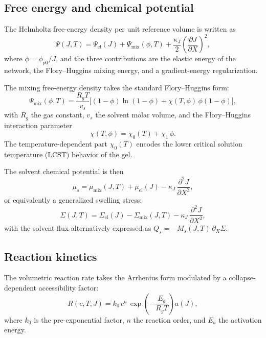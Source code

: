 \documentclass[aps,pre,reprint,superscriptaddress,longbibliography,floatfix]{revtex4-2}
\newcommand{\pp}{\phi_{p0}}
\begin{document}
\subsection{Free energy and chemical potential}

The Helmholtz free-energy density per unit reference volume is written as
\begin{equation}
  \Psi(J,T) = \Psi_\mathrm{el}(J) + \Psi_\mathrm{mix}(\phi,T)
  + \frac{\kappa_J}{2}\left(\frac{\partial J}{\partial X}\right)^2,
  \label{eq:Psi}
\end{equation}
where $\phi = \pp/J$, and the three contributions are the elastic energy of the network, the Flory--Huggins mixing energy, and a gradient-energy regularization.

The mixing free-energy density takes the standard Flory--Huggins form:
\begin{equation}
  \Psi_\mathrm{mix}(\phi,T)
  = \frac{R_g T}{v_s}
  \Big[(1-\phi)\ln(1-\phi) + \chi(T,\phi)\,\phi(1-\phi)\Big],
  \label{eq:Psi_mix}
\end{equation}
with $R_g$ the gas constant, $v_s$ the solvent molar volume, and the Flory--Huggins interaction parameter
\begin{equation}
  \chi(T,\phi) = \chi_0(T) + \chi_1\,\phi.
  \label{eq:chi}
\end{equation}
The temperature-dependent part $\chi_0(T)$ encodes the lower critical solution temperature (LCST) behavior of the gel.

The solvent chemical potential is then
\begin{equation}
  \mu_s = \mu_\mathrm{mix}(J,T) + \mu_\mathrm{el}(J)
  - \kappa_J\,\frac{\partial^2 J}{\partial X^2},
  \label{eq:mu_s}
\end{equation}
or equivalently a generalized swelling stress:
\begin{equation}
  \Sigma(J,T) = \Sigma_\mathrm{el}(J) - \Sigma_\mathrm{mix}(J,T)
  - \kappa_J\,\frac{\partial^2 J}{\partial X^2},
  \label{eq:Sigma}
\end{equation}
with the solvent flux alternatively expressed as $Q_s = -M_s(J,T)\,\partial_X \Sigma$.

\subsection{Reaction kinetics}

The volumetric reaction rate takes the Arrhenius form modulated by a collapse-dependent accessibility factor:
\begin{equation}
  R(c,T,J) = k_0\,c^n\,\exp\!\left(-\frac{E_a}{R_g T}\right) a(J),
  \label{eq:R}
\end{equation}
where $k_0$ is the pre-exponential factor, $n$ the reaction order, and $E_a$ the activation energy.
\end{document}
